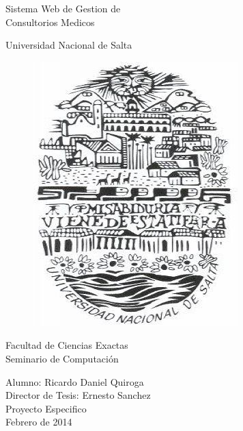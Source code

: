 
%


\begin{titlepage}


\begin{center}
    {\fontsize{45}{45} \selectfont 
    Sistema Web de Gestion de \\ Consultorios Medicos \\[2.3cm] }
\end{center}


\begin{center}
    \LARGE Universidad Nacional de Salta \\
    \begin{figure}[h]
        \begin{center}
        \includegraphics[scale=0.5]{resourse/logo-UNSa.jpg}
        \end{center}
    \end{figure}

    
    \LARGE Facultad de Ciencias Exactas \\
    Seminario de Computaci\'on \\ [2.3cm]
\end{center}


\begin{flushright}
    \Large Alumno: Ricardo Daniel Quiroga \\
    Director de Tesis: Ernesto Sanchez \\
    Proyecto Especifico \\ 
    Febrero de 2014 
    
    
\end{flushright}



\end{titlepage}


